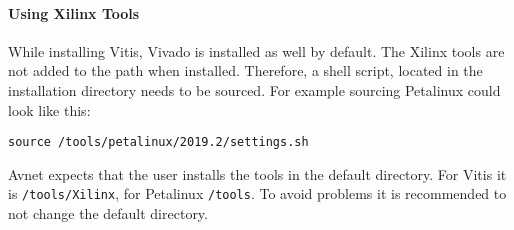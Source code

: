 \paragraph{Using Xilinx Tools}
While installing Vitis, Vivado is installed as well by default.
The Xilinx tools are not added to the path when installed.
Therefore, a shell script, located in the installation directory needs to be sourced.
For example sourcing Petalinux could look like this:
\begin{lstlisting}[style=bash, caption={}, label=lst:source_tools]
  source /tools/petalinux/2019.2/settings.sh
\end{lstlisting}
Avnet expects that the user installs the tools in the default directory.
For Vitis it is \texttt{/tools/Xilinx}, for Petalinux \texttt{/tools}.
To avoid problems it is recommended to not change the default directory.

